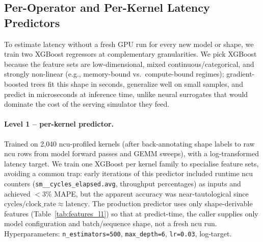 \subsection{Per-Operator and Per-Kernel Latency Predictors}
\label{sec:perop_method}

To estimate latency without a fresh GPU run for every new model or shape, we train two XGBoost regressors at complementary granularities. We pick XGBoost because the feature sets are low-dimensional, mixed continuous/categorical, and strongly non-linear (e.g., memory-bound vs.\ compute-bound regimes); gradient-boosted trees fit this shape in seconds, generalize well on small samples, and predict in microseconds at inference time, unlike neural surrogates that would dominate the cost of the serving simulator they feed.

\paragraph{Level 1 -- per-kernel predictor.} Trained on 2{,}040 ncu-profiled kernels (after back-annotating shape labels to raw ncu rows from model forward passes and GEMM sweeps), with a log-transformed latency target. We train one XGBoost per kernel family to specialise feature sets, avoiding a common trap: early iterations of this predictor included runtime ncu counters (\texttt{sm\_\_cycles\_elapsed.avg}, throughput percentages) as inputs and achieved $<$3\% MAPE, but the apparent accuracy was near-tautological since $\text{cycles}/\text{clock\_rate} \approx \text{latency}$. The production predictor uses only shape-derivable features (Table~\ref{tab:features_l1}) so that at predict-time, the caller supplies only model configuration and batch/sequence shape, not a fresh ncu run. Hyperparameters: \texttt{n\_estimators=500}, \texttt{max\_depth=6}, \texttt{lr=0.03}, log-target.

